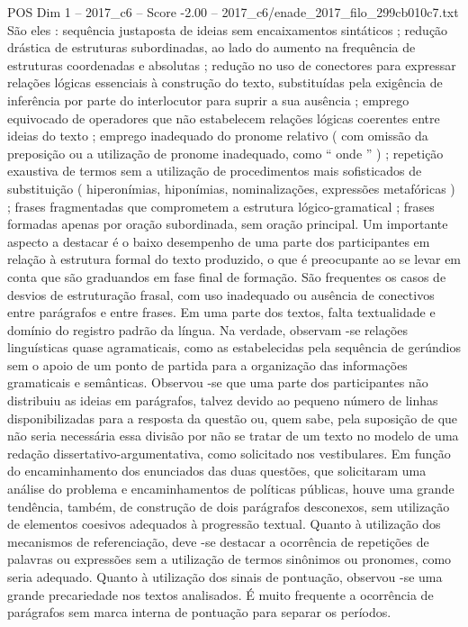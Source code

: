 \begin{textsample}{POS Dim 1 – 2017\_c6 – Score -2.00 – 2017\_c6/enade\_2017\_filo\_299cb010c7.txt}
São eles : sequência justaposta de ideias sem encaixamentos sintáticos ; redução drástica de estruturas subordinadas, ao lado do aumento na frequência de estruturas coordenadas e absolutas ; redução no uso de conectores para expressar relações lógicas essenciais à construção do texto, substituídas pela exigência de inferência por parte do interlocutor para suprir a sua ausência ; emprego equivocado de operadores que não estabelecem relações lógicas coerentes entre ideias do texto ; emprego inadequado do pronome relativo ( com omissão da preposição ou a utilização de pronome inadequado, como “ onde ” ) ; repetição exaustiva de termos sem a utilização de procedimentos mais sofisticados de substituição ( hiperonímias, hiponímias, nominalizações, expressões metafóricas ) ; frases fragmentadas que comprometem a estrutura lógico-gramatical ; frases formadas apenas por oração subordinada, sem oração principal.
Um importante aspecto a destacar é o baixo desempenho de uma parte dos participantes em relação à estrutura formal do texto produzido, o que é preocupante ao se levar em conta que são graduandos em fase final de formação.
São frequentes os casos de desvios de estruturação frasal, com uso inadequado ou ausência de conectivos entre parágrafos e entre frases.
Em uma parte dos textos, falta textualidade e domínio do registro padrão da língua.
Na verdade, observam -se relações linguísticas quase agramaticais, como as estabelecidas pela sequência de gerúndios sem o apoio de um ponto de partida para a organização das informações gramaticais e semânticas.
Observou -se que uma parte dos participantes não distribuiu as ideias em parágrafos, talvez devido ao pequeno número de linhas disponibilizadas para a resposta da questão ou, quem sabe, pela suposição de que não seria necessária essa divisão por não se tratar de um texto no modelo de uma redação dissertativo-argumentativa, como solicitado nos vestibulares.
Em função do encaminhamento dos enunciados das duas questões, que solicitaram uma análise do problema e encaminhamentos de políticas públicas, houve uma grande tendência, também, de construção de dois parágrafos desconexos, sem utilização de elementos coesivos adequados à progressão textual.
Quanto à utilização dos mecanismos de referenciação, deve -se destacar a ocorrência de repetições de palavras ou expressões sem a utilização de termos sinônimos ou pronomes, como seria adequado.
Quanto à utilização dos sinais de pontuação, observou -se uma grande precariedade nos textos analisados.
É muito frequente a ocorrência de parágrafos sem marca interna de pontuação para separar os períodos.

\end{textsample}
